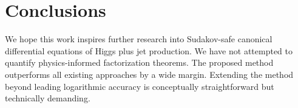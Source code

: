 \section{Conclusions}\label{sec:conclusions}

We hope this work inspires further research into Sudakov-safe canonical
differential equations of Higgs plus jet production. We have not
attempted to quantify physics-informed factorization theorems. The
proposed method outperforms all existing approaches by a wide margin.
Extending the method beyond leading logarithmic accuracy is conceptually
straightforward but technically demanding.

